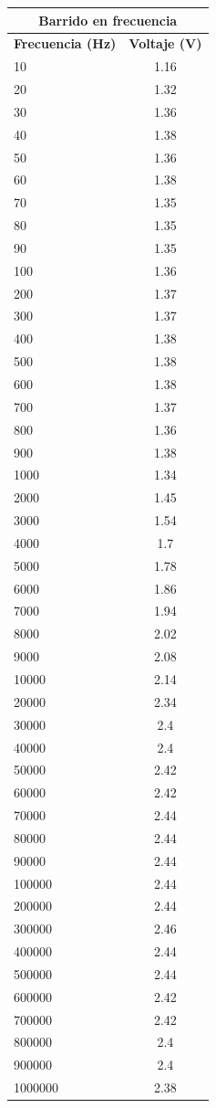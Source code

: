 \documentclass{article}
\begin{document}
 \begin{table}[H]
	\centering
	\begin{tabular}{|l|c||}
		\hline
		\multicolumn{2}{|c|}{\textbf{Barrido en frecuencia}}\\
		\hline
		\textbf{Frecuencia (Hz)} & \textbf{Voltaje (V)} \\
		\hline
	10&	1.16\\
	20&	1.32\\
		\hline
	30&	1.36\\
		\hline
	40&	1.38\\
		\hline
	50&	1.36\\
		\hline
	60&	1.38\\
		\hline
	70&	1.35\\
		\hline
	80&	1.35\\
		\hline
	90&	1.35\\
		\hline
	100&	1.36\\
		\hline
	200	&1.37\\
		\hline
	300	&1.37\\
		\hline
	400&	1.38\\
		\hline
	500	&1.38\\
		\hline
	600&	1.38\\
		\hline
	700&	1.37\\
		\hline
	800&	1.36\\
		\hline
	900&	1.38\\
		\hline
	1000&	1.34\\
		\hline
	2000&	1.45\\
		\hline
	3000&	1.54\\
		\hline
	4000&	1.7\\
		\hline
	5000&	1.78\\
		\hline
	6000&	1.86\\
		\hline
	7000&	1.94\\
		\hline
	8000&	2.02\\
		\hline
	9000&	2.08\\
		\hline
	10000&	2.14\\
		\hline
	20000&	2.34\\
		\hline
	30000&	2.4	\\
		\hline
	40000&	2.4\\
		\hline
	50000&	2.42\\
		\hline
	60000&	2.42\\
		\hline
	70000&	2.44\\
		\hline
	80000&	2.44\\
		\hline
	90000&	2.44\\
		\hline
	100000&	2.44\\
		\hline
	200000&	2.44\\
		\hline
	300000&	2.46\\
		\hline
	400000&	2.44\\
		\hline
	500000&	2.44\\
		\hline
	600000&	2.42\\
		\hline
	700000&	2.42\\
		\hline
	800000&	2.4\\
		\hline
	900000&	2.4\\
		\hline
	1000000&	2.38\\
		\hline
		\end{tabular}
\end{table}
\end{document}
